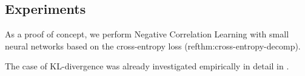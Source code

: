 \documentclass[../main.tex]{subfiles}
\begin{document}
\subsection{Experiments}


As a proof of concept, we perform Negative Correlation Learning with small neural networks based on the cross-entropy loss (ref{thm:cross-entropy-decomp}).

The case of KL-divergence was already investigated empirically in detail in \cite{Webb}.





\end{document}
